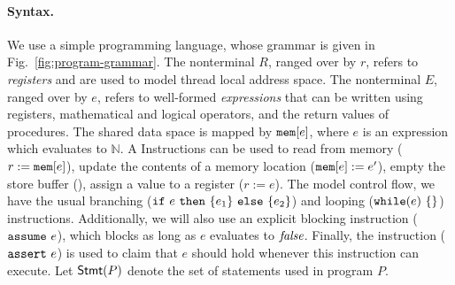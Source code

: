 \paragraph{Syntax.}
We use a simple programming language, whose grammar is given in Fig.~\ref{fig:program-grammar}.
The nonterminal $R$, ranged over by $r$, refers to {\em registers} and are used to model thread local address space.
The nonterminal $E$, ranged over by $e$, refers to well-formed {\em expressions} that can be written using registers, mathematical and logical operators, and the return values of procedures.
The shared data space is mapped by $\mathtt{mem}[e]$, where $e$ is an expression which evaluates to $\mathbb{N}$.
A 
Instructions can be used to read from memory ($r := \mathtt{mem}[e]$), update the contents of a memory location ($\mathtt{mem}[e] := e'$), empty the store buffer (\alifence), assign a value to a register ($r := e$).
The model control flow, we have the usual branching ($\mathtt{if}\ e\ \mathtt{then}\ \{e_1\}\ \mathtt{else}\ \{e_2\}$) and looping ($\aliwhilex e$) instructions.
Additionally, we will also use an explicit blocking instruction ($\mathtt{assume}\ e$), which blocks as long as $e$ evaluates to $\mathit{false}$.
Finally, the instruction ($\mathtt{assert}\ e$) is used to claim that $e$ should hold whenever this instruction can execute.
Let $\mathsf{Stmt} (P)$ denote the set of statements used in program $P$.

\newcommand{\alilabel}{\ensuremath{\mathsf{Lab}}}
\newcommand{\alilabelx}[1]{\ensuremath{\alilabel(#1)}}
\newcommand{\alicontrol}{\ensuremath{\mathsf{Ctrl}}}
\newcommand{\alicontrolx}[1]{\ensuremath{\alicontrol(#1)}}
\newcommand{\alivaluation}{\ensuremath{\mathsf{Val}}}
\newcommand{\alivaluationx}[1]{\ensuremath{\alivaluation(#1)}}
\newcommand{\alisucc}{\ensuremath{\mathsf{Succ}}}
\newcommand{\alisuccx}[1]{\ensuremath{\alisucc(#1)}}
\newcommand{\aliprec}{\ensuremath{\mathsf{Prec}}}
\newcommand{\aliprecx}[1]{\ensuremath{\aliprec(#1)}}
\newcommand{\alifirst}{\ensuremath{\mathsf{Fst}}}
\newcommand{\alifirstx}[1]{\ensuremath{\alifirst(#1)}}
\newcommand{\alisequencex}[1]{\ensuremath{\vec{#1}}}
\newcommand{\alieval}{\ensuremath{\llbracket \rrbracket}}
\newcommand{\alievalx}[1]{\ensuremath{\llbracket #1 \rrbracket}}
\newcommand{\alibuffer}{\ensuremath{\mathsf{Buf}}}
\newcommand{\alibufferx}[1]{\ensuremath{\alibuffer(#1)}}
\newcommand{\alireadbuffer}{\ensuremath{\mathsf{RdBuf}}}
\newcommand{\alireadbufferx}[2]{\ensuremath{\alireadbuffer(#1,#2)}}
\newcommand{\aliatomiclock}{\ensuremath{\mathsf{lck}}}
\newcommand{\aliatomicexitlabel}{\ensuremath{l_{x}}}
\newcommand{\alienabled}{\ensuremath{\mathsf{Enb}}}
\newcommand{\alienabledx}[1]{\ensuremath{\alienabled(#1)}}
\newcommand{\alilts}{\ensuremath{\mathnormal{LTS}}}
\newcommand{\aliltsx}[1]{\ensuremath{\alilts(#1)}}
\newcommand{\alitrace}{\ensuremath{\mathsf{Tr}}}
\newcommand{\alitracex}[1]{\ensuremath{\alitrace(#1)}}
\newcommand{\alimemtrace}{\ensuremath{\mathsf{Mem}}}
\newcommand{\alimemtracex}[1]{\ensuremath{\alimemtrace(#1)}}
\newcommand{\aliosrules}{\ensuremath{Rules}}

